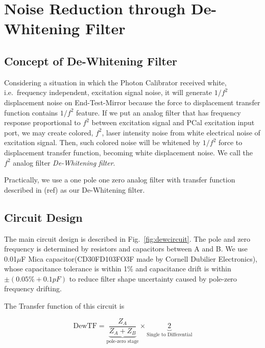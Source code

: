 

\chapter{Noise Reduction through De-Whitening Filter}

\section{Concept of De-Whitening Filter}
Considering a situation in which the Photon Calibrator received white, i.e.\ frequency independent, excitation signal noise, it will generate $1/f^2$ displacement noise on End-Test-Mirror because the force to displacement transfer function contains $1/f^2$ feature. If we put an analog filter that has frequency response proportional to $f^2$ between excitation signal and PCal excitation input port, we may create colored, $f^2$, laser intensity noise from white electrical noise of excitation signal. Then, such colored noise will be whitened by $1/f^2$ force to displacement transfer function, becoming white displacement noise. We call the $f^2$ analog filter \emph{De-Whitening filter}.


Practically, we use a one pole one zero analog filter with transfer function described in (ref) as our De-Whitening filter. 


\section{Circuit Design}
The main circuit design is described in Fig.~\ref{fig:dewcircuit}. The pole and zero frequency is determined by resistors and capacitors between A and B. We use 0.01$\mu$F Mica capacitor(CD30FD103FO3F made by Cornell Dubilier Electronics), whose capacitance tolerance is within 1\% and capacitance drift is within $\pm(0.05\% +0.1 pF)$ to reduce filter shape uncertainty caused by pole-zero frequency drifting.

The Transfer function of this circuit is

\begin{equation}
\label{eq:dewtf}
    \mathrm{DewTF} = \underbrace{\frac{Z_A}{Z_A+Z_B}}_{\text{pole-zero stage}} \times \underbrace{2}_{\text{Single to Differential}}
\end{equation}


